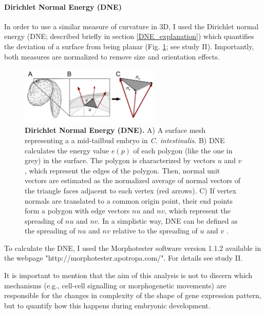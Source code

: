 \paragraph{Dirichlet Normal Energy (DNE)}
In order to use a similar measure of curvature in 3D, I used the Dirichlet normal energy (DNE; described briefly in section \ref{DNE_explanation}) which quantifies the deviation of a surface from being planar (Fig. \ref{fig:DNE}; see study II). 
Importantly, both measures are normalized to remove size and orientation effects.

\begin{figure}[h]
  \includegraphics[width=0.6\textwidth]{./Images/DNE.png}
  \centering
  \caption{\textbf{Dirichlet Normal Energy (DNE).} A) A surface mesh representing a a mid-tailbud embryo in \textit{C. intestinalis}. B) DNE calculates the energy value $e(p)$ of each polygon (like the one in grey) in the surface. The polygon is characterized by vectors $u$ and $v$, which represent the edges of the polygon. Then, normal unit vectors are estimated as the normalized average of normal vectors of the triangle faces adjacent to each vertex (red arrows). C) If vertex normals are translated to a common origin point, their end points form a polygon with edge vectors $nu$ and $nv$, which represent the spreading of $nu$ and $nv$. In a simplistic way, DNE can be defined as the spreading of $nu$ and $nv$ relative to the spreading of $u$ and $v$  \citep{Bunn2011,Winchester2016}.
 }
  \label{fig:DNE}
\end{figure}

To calculate the DNE, I used the Morphotester software version 1.1.2 \citep{Winchester2016}
available in the webpage "http://morphotester.apotropa.com/". For details see study II.

It is important to mention that the aim of this analysis is not to discern which mechanisms (e.g., cell-cell signalling or morphogenetic movements) are responsible for the changes in complexity of the shape of gene expression pattern, but to quantify how this happens during embryonic development.

